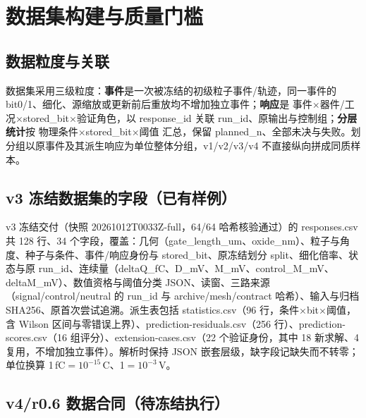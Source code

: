 \section{数据集构建与质量门槛}

\subsection{数据粒度与关联}

数据集采用三级粒度：\textbf{事件}是一次被冻结的初级粒子事件/轨迹，同一事件的 bit0/1、细化、源缩放或更新前后重放均不增加独立事件；\textbf{响应}是 事件$\times$器件/工况$\times$stored\_bit$\times$验证角色，以 response\_id 关联 run\_id、原输出与控制组；\textbf{分层统计}按 物理条件$\times$stored\_bit$\times$阈值 汇总，保留 planned\_n、全部未决与失败。划分组以原事件及其派生响应为单位整体分组，v1/v2/v3/v4 不直接纵向拼成同质样本。

\subsection{v3 冻结数据集的字段（已有样例）}

v3 冻结交付（快照 20261012T0033Z-full，64/64 哈希核验通过）的 responses.csv 共 128 行、34 个字段，覆盖：几何（gate\_length\_um、oxide\_nm）、粒子与角度、种子与条件、事件/响应身份与 stored\_bit、原冻结划分 split、细化倍率、状态与原 run\_id、连续量（deltaQ\_fC、D\_mV、M\_mV、control\_M\_mV、deltaM\_mV）、数值资格与阈值分类 JSON、读窗、三路来源（signal/control/neutral 的 run\_id 与 archive/mesh/contract 哈希）、输入与归档 SHA256、原首次尝试追溯。派生表包括 statistics.csv（96 行，条件$\times$bit$\times$阈值，含 Wilson 区间与零错误上界）、prediction-residuals.csv（256 行）、prediction-scores.csv（16 组评分）、extension-cases.csv（22 个验证身份，其中 18 新求解、4 复用，不增加独立事件）。解析时保持 JSON 嵌套层级，缺字段记缺失而不转零；单位换算 1\,fC$=10^{-15}$\,C、1\mV$=10^{-3}$\,V。

\subsection{v4/r0.6 数据合同（待冻结执行）}

